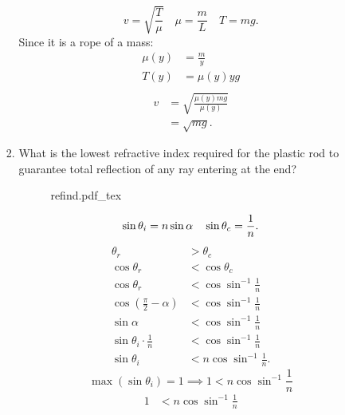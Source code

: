 \documentclass{article}
\newcommand{\incfig}[2][1]{%
    \def\svgwidth{#1\columnwidth}
    {#2.pdf_tex}
}
\begin{document}
\begin{enumerate}
\begin{enumerate}
\begin{enumerate}
            \begin{equation}
              v=\sqrt{\frac{T}{\mu}} \quad \mu = \frac{m}{L} \quad T=mg
            .\end{equation}
            Since it is a rope of a mass:
            \begin{align}
              \mu(y) & =\frac{m}{y}\\
              T(y) & = \mu(y)yg \\
            \end{align}
            \begin{align}
              v & = \sqrt{\frac{\mu(y)mg}{\mu(y)}}  \\
                & = \sqrt{mg}
            .\end{align}
            \newpage
          \item What is the lowest refractive index required for the plastic
            rod to guarantee total reflection of any ray entering at the end?
            \begin{figure}[ht]
                \centering
                \incfig{refind}
                \caption{}
                \label{fig:refind}
            \end{figure}
            \begin{equation}
              \sin\theta_i = n\sin\alpha \quad \sin\theta_c = \frac{1}{n} \\
            .\end{equation}
            \begin{align}
              \theta_r &> \theta_c \\
              \cos\theta_r &< \cos\theta_c \\
              \cos\theta_r &< \cos\sin^{-1}\frac{1}{n} \\
              \cos\left( \frac{\pi}{2}-\alpha \right) &< \cos\sin^{-1}\frac{1}{n} \\
              \sin\alpha &< \cos\sin^{-1}\frac{1}{n} \\
              \sin\theta_i\cdot \frac{1}{n} &< \cos\sin^{-1}\frac{1}{n} \\
              \sin\theta_i &< n\cos\sin^{-1}\frac{1}{n}
            .\end{align}
            \begin{equation}
              \max( \sin\theta_i ) = 1 \implies 1 < n\cos\sin^{-1}\frac{1}{n}
            \end{equation}
            \begin{align}
              1 &< n\cos\sin^{-1}\frac{1}{n} \\

\end{align}
\end{enumerate}
\end{enumerate}
\end{enumerate}
\end{document}

